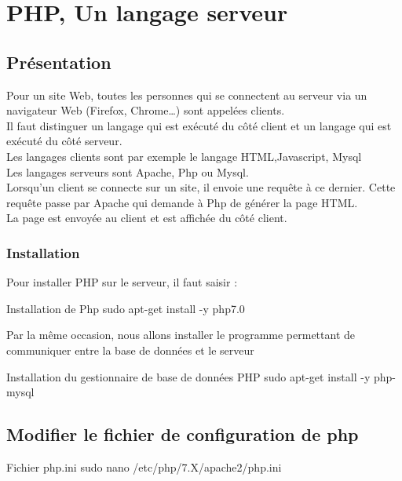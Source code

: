 \chapter{PHP, Un langage serveur}

\section{Présentation}
Pour un site Web, toutes les personnes qui se connectent au serveur via un navigateur Web (Firefox, Chrome…) sont appelées clients. \\
Il faut distinguer un langage qui est exécuté du côté client et un langage qui est exécuté du côté serveur. \\

Les langages clients sont par exemple le langage HTML,Javascript, Mysql \\
Les langages serveurs sont Apache, Php ou Mysql. \\

Lorsqu’un client se connecte sur un site, il envoie une requête à ce dernier. Cette requête passe par Apache qui demande à Php de générer la page HTML. \\
La page est envoyée au client et est affichée du côté client. \\


\subsection{Installation}
Pour installer PHP sur le serveur, il faut saisir :

\begin{Bash}{Installation de Php}
sudo apt-get install -y php7.0
\end{Bash}

Par la même occasion, nous allons installer le programme permettant de communiquer entre la base de données et le serveur

\begin{Bash}{Installation du gestionnaire de base de données PHP}
sudo apt-get install -y php-mysql
\end{Bash}


\section{Modifier le fichier de configuration de php}
\begin{Bash}{Fichier php.ini}
sudo nano /etc/php/7.X/apache2/php.ini
\end{Bash}



